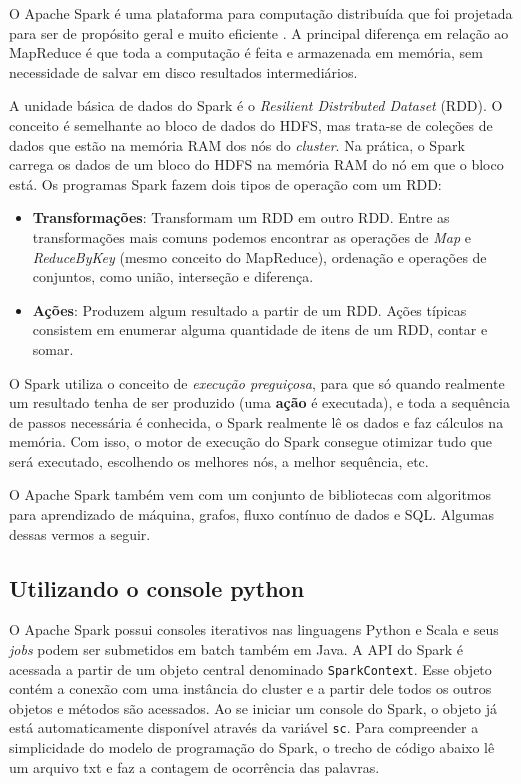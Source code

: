 O Apache Spark é uma plataforma para computação distribuída que foi projetada para ser de propósito 
geral e muito eficiente \cite{zaharia2012resilient, karau2015learning}. A principal diferença em 
relação ao MapReduce é que toda a computação é feita e armazenada em memória, sem necessidade de salvar 
em disco resultados intermediários. 

A unidade básica de dados do Spark é o \textit{Resilient Distributed Dataset} (RDD). O conceito é 
semelhante ao bloco de dados do HDFS, mas trata-se de coleções de dados que estão na memória RAM dos 
nós do \textit{cluster}. Na prática, o Spark carrega os dados de um bloco do HDFS na memória RAM do nó 
em que o bloco está. Os programas Spark fazem dois tipos de operação com um RDD:

\begin{itemize}
	\item \textbf{Transformações}: Transformam um RDD em outro RDD. Entre as transformações mais 
comuns podemos encontrar as operações de \textit{Map} e \textit{ReduceByKey} (mesmo conceito do MapReduce), 
ordenação e operações de conjuntos, como união, interseção e diferença.
	\item \textbf{Ações}: Produzem algum resultado a partir de um RDD. Ações típicas consistem em 
enumerar alguma quantidade de itens de um RDD, contar e somar. 
\end{itemize}

O Spark utiliza o conceito de \emph{execução preguiçosa}, para que só quando realmente um resultado 
tenha de ser produzido (uma \textbf{ação} é executada), e toda a sequência de passos necessária é 
conhecida, o Spark realmente lê os dados e faz cálculos na memória. Com isso, o motor de execução do 
Spark consegue otimizar tudo que será executado, escolhendo os melhores nós, a melhor sequência, etc.

O Apache Spark também vem com um conjunto de bibliotecas com algoritmos para aprendizado de máquina, 
grafos, fluxo contínuo de dados e SQL. Algumas dessas vermos a seguir.

\subsection{Utilizando o console python}
O Apache Spark possui consoles iterativos nas linguagens Python e Scala e seus \textit{jobs} podem 
ser submetidos em batch também em Java. A API do Spark é acessada a partir de um objeto central 
denominado \texttt{SparkContext}. Esse objeto contém a conexão com uma instância do cluster e a partir 
dele todos os outros objetos e métodos são acessados. Ao se iniciar um console do Spark, o objeto já 
está automaticamente disponível através da variável \texttt{sc}. Para compreender a simplicidade 
do modelo de programação do Spark, o trecho de código abaixo lê um arquivo txt e faz a contagem de 
ocorrência das palavras.

